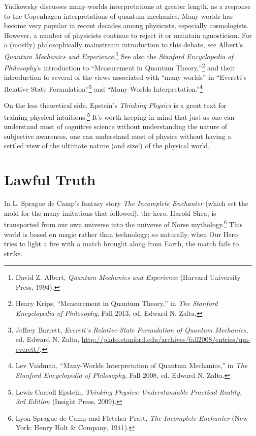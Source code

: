 {
 Yudkowsky discusses many-worlds interpretations at greater length,
as a response to the Copenhagen interpretations of quantum mechanics.
Many-worlds has become very popular in recent decades among physicists,
especially cosmologists. However, a number of physicists continue to
reject it or maintain agnosticism. For a (mostly) philosophically
mainstream introduction to this debate, see Albert's
\textit{Quantum Mechanics and Experience}.\footnote{David Z. Albert, \textit{Quantum Mechanics and Experience}
(Harvard University Press, 1994).} See also
the \textit{Stanford Encyclopedia of Philosophy}'s
introduction to ``Measurement in Quantum
Theory,''\footnote{Henry Krips, ``Measurement in Quantum
Theory,'' in \textit{The Stanford Encyclopedia of
Philosophy}, Fall 2013, ed. Edward N. Zalta.} and their introduction
to several of the views associated with ``many
worlds'' in
``Everett's Relative-State
Formulation''\footnote{Jeffrey Barrett, \textit{Everett's
Relative-State Formulation of Quantum Mechanics}, ed. Edward N. Zalta,
\url{http://plato.stanford.edu/archives/fall2008/entries/qm-everett/}.} and
``Many-Worlds
Interpretation.''\footnote{Lev Vaidman, ``Many-Worlds Interpretation of
Quantum Mechanics,'' in \textit{The Stanford
Encyclopedia of Philosophy}, Fall 2008, ed. Edward N. Zalta.}}

{
 On the less theoretical side, Epstein's
\textit{Thinking Physics} is a great text for training physical
intuitions.\footnote{Lewis Carroll Epstein, \textit{Thinking Physics:
Understandable Practical Reality, 3rd Edition} (Insight Press, 2009).} It's worth keeping in
mind that just as one can understand most of cognitive science without
understanding the nature of subjective awareness, one can understand
most of physics without having a settled view of the ultimate nature
(and size!) of the physical world.}


\chapter{Lawful Truth}


{
 In L. Sprague de Camp's fantasy story \textit{The
Incomplete Enchanter} (which set the mold for the many imitations that
followed), the hero, Harold Shea, is transported from our own universe
into the universe of Norse mythology.\footnote{Lyon Sprague de Camp and Fletcher Pratt, \textit{The Incomplete
Enchanter} (New York: Henry Holt \& Company, 1941).} This world is
based on magic rather than technology; so naturally, when Our Hero
tries to light a fire with a match brought along from Earth, the match
fails to strike. }

